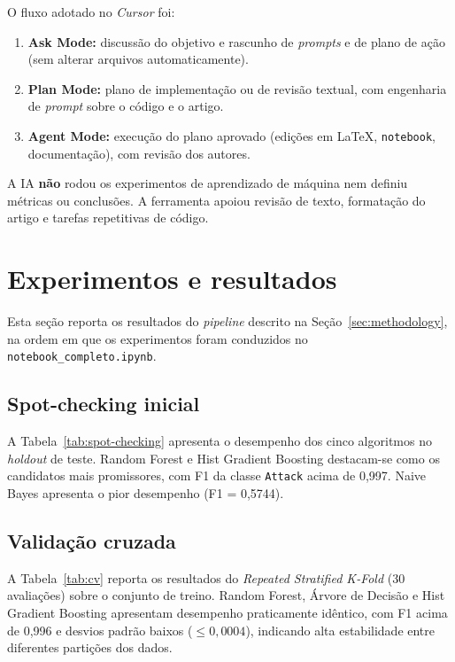\documentclass[12pt]{article}
\makeatletter
\newlength{\sbcblockmargin}
\newenvironment{sbcnarrowblock}{%
  \list{}{%
    \topsep\z@
    \partopsep\z@
    \itemsep\z@
    \parsep\z@
    \leftmargin=\sbcblockmargin
    \rightmargin=\sbcblockmargin
    \listparindent=\parindent
    \itemindent=\z@
    \labelwidth=\z@
    \labelsep=\z@
  }\item\relax}
{\endlist}
\makeatother
\begin{document}
\begin{sbcnarrowblock}
O fluxo adotado no \textit{Cursor} foi:
\begin{enumerate}
  \item \textbf{Ask Mode:} discussão do objetivo e rascunho de \textit{prompts} e de plano de ação (sem alterar arquivos automaticamente).
  \item \textbf{Plan Mode:} plano de implementação ou de revisão textual, com engenharia de \textit{prompt} sobre o código e o artigo.
  \item \textbf{Agent Mode:} execução do plano aprovado (edições em \LaTeX{}, \texttt{notebook}, documentação), com revisão dos autores.
\end{enumerate}

A IA \textbf{não} rodou os experimentos de aprendizado de máquina nem definiu métricas ou conclusões.
A ferramenta apoiou revisão de texto, formatação do artigo e tarefas repetitivas de código.

\FloatBarrier

\section{Experimentos e resultados}
\label{sec:experiments}

Esta seção reporta os resultados do \textit{pipeline} descrito na Seção~\ref{sec:methodology}, na ordem em que os experimentos foram conduzidos no \texttt{notebook\_completo.ipynb}.

\subsection{Spot-checking inicial}
\label{sec:spot-checking}

A Tabela~\ref{tab:spot-checking} apresenta o desempenho dos cinco algoritmos no \textit{holdout} de teste.
Random Forest e Hist Gradient Boosting destacam-se como os candidatos mais promissores, com F1 da classe \texttt{Attack} acima de 0,997.
Naive Bayes apresenta o pior desempenho (F1 = 0,5744).

\subsection{Validação cruzada}
\label{sec:cv-results}

A Tabela~\ref{tab:cv} reporta os resultados do \textit{Repeated Stratified K-Fold} (30 avaliações) sobre o conjunto de treino.
Random Forest, Árvore de Decisão e Hist Gradient Boosting apresentam desempenho praticamente idêntico, com F1 acima de 0,996 e desvios padrão baixos ($\leq 0{,}0004$), indicando alta estabilidade entre diferentes partições dos dados.


\end{sbcnarrowblock}
\end{document}
